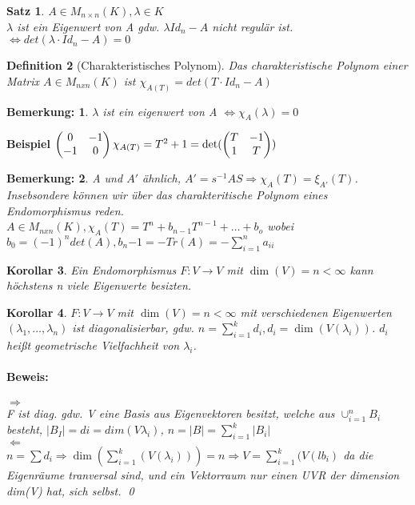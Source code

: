 \documentclass{report}
\newcommand{\lb}{\lambda}
\theoremstyle{customrem}
\newtheorem*{bemerkung}{Bemerkung\textnormal:}
\theoremstyle{customdef}
\newtheorem{definition}{Definition}[chapter]
\newtheorem{korrolar}[definition]{Korollar}
\newtheorem{satz}[definition]{Satz}
\renewenvironment{proof}{\paragraph{Beweis: }}{\qed}
\theoremstyle{customenv}
\begin{document}
\begin{satz}
  \(A \in M_{n\times n}(K), \lb \in K\)\\
  \(\lb\) ist ein Eigenwert von A gdw. \(\lb Id_n - A\) nicht regul\"ar ist.
  \(\Leftrightarrow det(\lb \cdot Id_n -A) = 0\)
\end{satz}

\begin{definition}[Charakteristisches Polynom]
  Das charakteristische Polynom einer Matrix \(A \in M_{nxn}(K)\) ist 
  \(\chi_{A(T)} = det(T \cdot Id_n - A)\)
\end{definition}

\begin{bemerkung}
  \(\lb\) ist ein eigenwert von A \(\Leftrightarrow \chi_A(\lb) = 0\)
\end{bemerkung}

\textbf{Beispiel}
\(
  \begin{pmatrix}
   0 & -1\\
   -1 & 0
  \end{pmatrix}\\
  \chi_{A(T)} = T^2 + 1 = \det(
  \begin{pmatrix}
    T & -1\\
    1 & T
  \end{pmatrix}
  )
\)

\begin{bemerkung}
  A und \(A'\) \"ahnlich, \(A' = s^{-1}AS \Rightarrow \chi_A(T) = \xi_{A'}(T)\).
  Insebsondere k\"onnen wir \"uber das charakteritische Polynom eines
  Endomorphismus reden.\\
  \(A \in M_{nxn}(K), \chi_A(T) = T^n + b_{n-1} T^{n-1} + \dots + b_o\) wobei
  \(b_0 = (-1)^n det(A), b_n{-1} = - Tr(A) = - \sum_{i=1}^n a_{ii}\)
\end{bemerkung}

\begin{korrolar}
  Ein Endomorphismus \(F : V \to V\) mit \(\dim(V) = n < \infty\) kann
  h\"ochstens n viele Eigenwerte besizten.
\end{korrolar}

\begin{korrolar}
  \(F : V \to V\) mit \(\dim(V) = n < \infty\) mit verschiedenen Eigenwerten
  \((\lb_1, \dots, \lb_n)\) ist diagonalisierbar,  gdw. 
  \(n = \sum_{i=1}^k d_i, d_i = \dim(V(\lb_i))\). \(d_i\) hei\ss{}t geometrische
  Vielfachheit von \(\lb_i\).
  
  \begin{proof} \hfill\break
  \(\Rightarrow\)\\
  F ist diag. gdw. V eine Basis aus Eigenvektoren besitzt, welche aus
  \(\cup_{i=1}^n B_i\) besteht, \(|B_I| = di = dim(V\lb_i)\),
  \(n = |B| = \sum_{i=1}^k |B_i|\)\\
  \(\Leftarrow\)\\
    \(n = \sum d_i \Rightarrow \dim(\sum_{i=1}^k (V(\lb_i))) = n
    \Rightarrow V = \sum_{i=1}^k(V(lb_i)\) da die Eigenr\"aume tranversal sind,
     und ein Vektorraum nur einen UVR der dimension dim(V) hat, sich selbst.
  \end{proof}
\end{korrolar}
\end{document}
